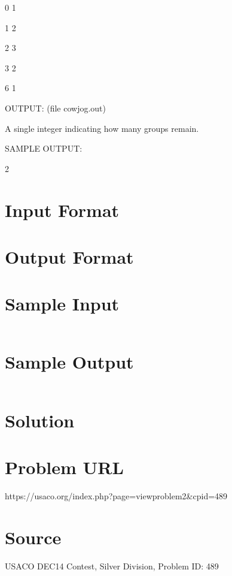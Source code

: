 \documentclass[12pt]{article}
\begin{document}
0 1

1 2

2 3

3 2

6 1



OUTPUT: (file cowjog.out)



A single integer indicating how many groups remain.



SAMPLE OUTPUT:



2




\section*{Input Format}


\section*{Output Format}


\section*{Sample Input}
\begin{verbatim}

\end{verbatim}

\section*{Sample Output}
\begin{verbatim}

\end{verbatim}

\section*{Solution}


\section*{Problem URL}
https://usaco.org/index.php?page=viewproblem2&cpid=489

\section*{Source}
USACO DEC14 Contest, Silver Division, Problem ID: 489
\end{document}
